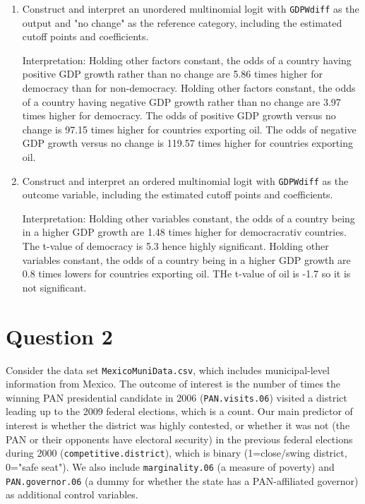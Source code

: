 \documentclass[12pt,letterpaper]{article}
\begin{document}
\begin{enumerate}
	\item Construct and interpret an unordered multinomial logit with \texttt{GDPWdiff} as the output and "no change" as the reference category, including the estimated cutoff points and coefficients.
	 
	\noindent Interpretation: Holding other factors constant, the odds of a country having positive GDP growth rather than no change are 5.86 times higher for democracy than for non-democracy. Holding other factors constant, the odds of a country having negative GDP growth rather than no change are 3.97 times higher for democracy. The odds of positive GDP growth versus no change is 97.15 times higher for countries exporting oil. The odds of negative GDP growth versus no change is 119.57 times higher for countries exporting oil.
	\item Construct and interpret an ordered multinomial logit with \texttt{GDPWdiff} as the outcome variable, including the estimated cutoff points and coefficients.
	 
	\noindent Interpretation: Holding other variables constant, the odds of a country being in a higher GDP growth are 1.48 times higher for democracrativ countries. The t-value of democracy is 5.3 hence highly significant. Holding other variables constant, the odds of a country being in a higher GDP growth are 0.8 times lowers for countries exporting oil. THe t-value of oil is -1.7 so it is not significant.

\end{enumerate}

\section*{Question 2} 
\vspace{.25cm}

\noindent Consider the data set \texttt{MexicoMuniData.csv}, which includes municipal-level information from Mexico. The outcome of interest is the number of times the winning PAN presidential candidate in 2006 (\texttt{PAN.visits.06}) visited a district leading up to the 2009 federal elections, which is a count. Our main predictor of interest is whether the district was highly contested, or whether it was not (the PAN or their opponents have electoral security) in the previous federal elections during 2000 (\texttt{competitive.district}), which is binary (1=close/swing district, 0="safe seat"). We also include \texttt{marginality.06} (a measure of poverty) and \texttt{PAN.governor.06} (a dummy for whether the state has a PAN-affiliated governor) as additional control variables. 
\end{document}
